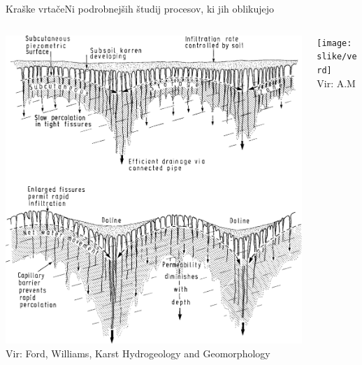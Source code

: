 \documentclass{beamer}
\begin{document}
\begin{frame}{Kraške vrtače}{Ni podrobnejših študij procesov, ki jih oblikujejo}

\begin{columns}
  \begin{column}{0.6\textwidth}
    \includegraphics[width=\textwidth]{slike/vrtaca-ford-williams}
    \tiny{\\Vir: Ford, Williams, Karst Hydrogeology and Geomorphology}
  \end{column}

  \begin{column}{0.5\textwidth}
    \texttt{[image: slike/verd]}
    \tiny{\\Vir: A.M}
  \end{column}
\end{columns}
\end{frame}
\end{document}
